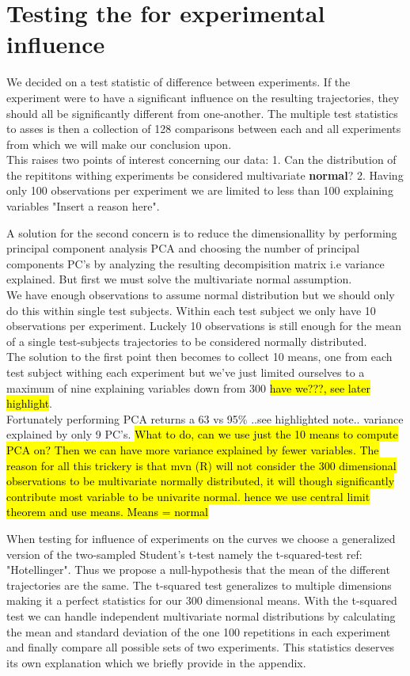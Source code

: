 \documentclass{article}
\begin{document}
\section{Testing the for experimental influence}
We decided on a test statistic of difference between experiments. If the experiment were to have a significant influence on the resulting trajectories, they should all be significantly different from one-another. The multiple test statistics to asses is then a collection of 128 comparisons between each and all experiments from which we will make our conclusion upon.\\ This raises two points of interest concerning our data:
1. Can the distribution of the repititons withing experiments be considered multivariate \textbf{normal}?
2. Having only 100 observations per experiment we are limited to less than 100 explaining variables "Insert a reason here".

A solution for the second concern is to reduce the dimensionallity by performing principal component analysis PCA and choosing the number of principal components PC's by analyzing the resulting decompisition matrix i.e variance explained. But first we must solve the  multivariate normal assumption. \\
 We have enough observations to assume normal distribution but we should only do this within single test subjects. Within each test subject we only have 10 observations per experiment. Luckely 10 observations is still enough for the mean of a single test-subjects trajectories to be considered normally distributed. \\ The solution to the first point then becomes to collect 10 means, one from each test subject withing each experiment but we've just limited ourselves to a maximum of nine explaining variables down from 300 \hl{have we???, see later highlight}. \\
 Fortunately performing PCA returns a 63 vs 95\% ..see highlighted note.. variance explained by only 9 PC's. \hl{What to do, can we use just the 10 means to compute PCA on? Then we can have more variance explained by fewer variables. The reason for all this trickery is that mvn (R) will not consider the 300 dimensional observations to be multivariate normally distributed, it will though significantly contribute most variable to be univarite normal. hence we use central limit theorem and use means. Means = normal}

When testing for influence of experiments on the curves we choose a  generalized version of the two-sampled Student's t-test namely the t-squared-test ref: "Hotellinger". Thus we propose a null-hypothesis that the mean of the different trajectories are the same. The t-squared test generalizes to multiple dimensions making it a perfect statistics for our 300 dimensional means. With the t-squared test we can handle independent multivariate normal distributions by calculating the mean and standard deviation of the one 100 repetitions in each experiment and finally compare all possible sets of two experiments. This statistics deserves its own explanation which we briefly provide in the appendix.
\end{document}
